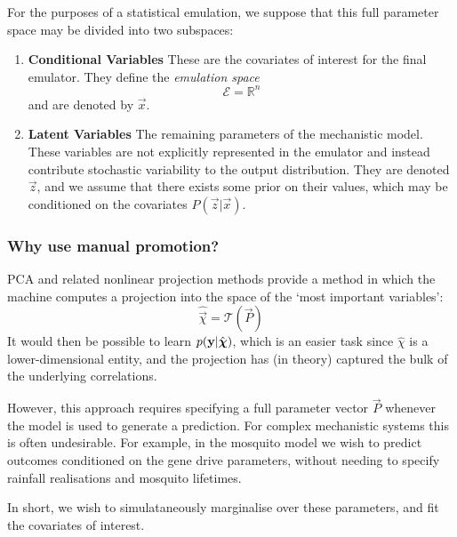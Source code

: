 		For the purposes of a statistical emulation, we suppose that this full parameter space may be divided into two subspaces:

		\begin{enumerate}
			\item \textbf{Conditional Variables} These are the covariates of interest for the final emulator.
			      They define the \emph{emulation space}
			      \begin{equation}
				      \mathcal{E} = \mathbb{R}^n
			      \end{equation}
			      and are denoted by $\vec{x}$.

			\item \textbf{Latent Variables} The remaining parameters of the mechanistic model.
			      These variables are not explicitly represented in the emulator and instead contribute stochastic variability to the output distribution. They are denoted $\vec{z}$, and we assume that there exists some prior on their values, which may be conditioned on the covariates $P(\vec{z} | \vec{x})$.
		\end{enumerate}



	\subsubsection*{Why use manual promotion?}

		PCA and related nonlinear projection methods provide a method in which the machine computes a projection into the space of the `most important variables':
		\begin{equation}
			\hat{\vec{\chi}} = \mathcal{T}(\vec{P})
		\end{equation}
		It would then be possible to learn $p(\mathbf{\boldsymbol{\mathrm{y}}} | \hat{\mathbf{\boldsymbol{\mathrm{\chi}}}})$, which is an easier task since $\hat{\chi}$ is a lower-dimensional entity, and the projection has (in theory) captured the bulk of the underlying correlations.

		However, this approach requires specifying a full parameter vector $\vec{P}$ whenever the model is used to generate a prediction. For complex mechanistic systems this is often undesirable. For example, in the mosquito model we wish to predict outcomes conditioned on the gene drive parameters, without needing to specify rainfall realisations and mosquito lifetimes.

		In short, we wish to simulataneously marginalise over these parameters, and fit the covariates of interest.


